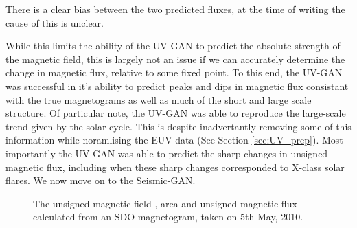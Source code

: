 \documentclass[11pt,a4paper,onecolumn]{report}
\begin{document}
There is a clear bias between the two predicted fluxes, at
the time of writing the cause of this is unclear.

While this limits the ability of the UV-GAN to predict the absolute strength of
the magnetic field, this is largely not an issue if we can accurately determine
the change in magnetic flux, relative to some fixed point.
To this end, the UV-GAN was successful in it's ability to predict peaks and dips
in magnetic flux consistant with the true magnetograms as well as much of the
short and large scale structure. Of particular note, the UV-GAN was able to
reproduce the large-scale trend given by the solar cycle. This is despite
inadvertantly removing some of this information while noramlising the EUV data
(See Section \ref{sec:UV_prep}). Most importantly the UV-GAN was able to predict
the sharp changes in unsigned magnetic flux, including when these sharp changes
corresponded to X-class solar flares. We now move on to the Seismic-GAN. 


\begin{figure}[t]%
  \centering
  \caption[]{The unsigned magnetic field , area
   and unsigned
  magnetic flux  calculated from an SDO magnetogram,
  taken on 5th May, 2010.}
  \label{fig:tumf_calc}
\end{figure}
\end{document}

